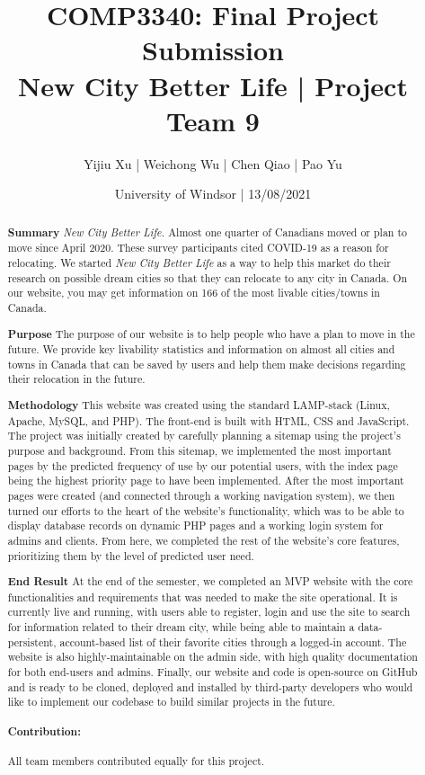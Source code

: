 \documentclass[12pt, letterpaper]{article}
\title{COMP3340: Final Project Submission \\{New City Better Life | Project Team 9}}
\author{Yijiu Xu | Weichong Wu | Chen Qiao | Pao Yu}
\date{University of Windsor | 13/08/2021}
\begin{document}
\maketitle

\begin{abstract}

    \textbf{Summary}
    \textit{New City Better Life.} Almost one quarter of Canadians moved or plan to move since April 2020. These survey participants cited COVID-19 as a reason for relocating. We started \textit{New City Better Life} as a way to help this market do their research on possible dream cities so that they can relocate to any city in Canada. On our website, you may get information on 166 of the most livable cities/towns in Canada.
    
    \textbf{Purpose}
    The purpose of our website is to help people who have a plan to move in the future. We provide key livability statistics and information on almost all cities and towns in Canada that can be saved by users and help them make decisions regarding their relocation in the future.
   
    \textbf{Methodology}
    This website was created using the standard LAMP-stack (Linux, Apache, MySQL, and PHP). The front-end is built with HTML, CSS and JavaScript. The project was initially created by carefully planning a sitemap using the project's purpose and background. From this sitemap, we implemented the most important pages by the predicted frequency of use by our potential users, with the index page being the highest priority page to have been implemented. After the most important pages were created (and connected through a working navigation system), we then turned our efforts to the heart of the website's functionality, which was to be able to display database records on dynamic PHP pages and a working login system for admins and clients. From here, we completed the rest of the website's core features, prioritizing them by the level of predicted user need.

    \textbf{End Result}
    At the end of the semester, we completed an MVP website with the core functionalities and requirements that was needed to make the site operational. It is currently live and running, with users able to register, login and use the site to search for information related to their dream city, while being able to maintain a data-persistent, account-based list of their favorite cities through a logged-in account. The website is also highly-maintainable on the admin side, with high quality documentation for both end-users and admins. Finally, our website and code is open-source on GitHub and is ready to be cloned, deployed and installed by third-party developers who would like to implement our codebase to build similar projects in the future.

\paragraph*{Contribution: } All team members contributed equally for this project.

\end{abstract}
\end{document}
